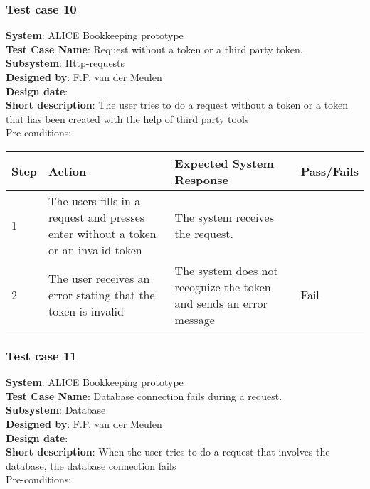 \subsubsection{Test case 10}
\textbf{System}:  ALICE Bookkeeping prototype \\
\textbf{Test Case Name}:  Request without a token or a third party token. \\
\textbf{Subsystem}:  Http-requests \\
\textbf{Designed by}:  F.P. van der Meulen\\
\textbf{Design date}:  \\
\textbf{Short description}: The user tries to do a request without a token or a token that has been created with the help of third party tools \\

Pre-conditions: \\

\begin{longtable}{ | p{0.8cm} | p{4.5cm} | p{6cm} | p{1.5cm} |}
\hline
Step & Action & Expected System Response & Pass/Fails  \\ \hline
1 & The users fills in a request and presses enter without a token or an invalid token & The system receives the request. &  \\ \hline
2 & The user receives an error stating that the token is invalid & The system does not recognize the token and sends an error message & Fail \\ \hline
\end{longtable}
\subsubsection{Test case 11}
\textbf{System}:  ALICE Bookkeeping prototype \\
\textbf{Test Case Name}:  Database connection fails during a request. \\
\textbf{Subsystem}:  Database \\
\textbf{Designed by}:  F.P. van der Meulen\\
\textbf{Design date}:  \\
\textbf{Short description}: When the user tries to do a request that involves the database, the database connection fails \\

Pre-conditions: \\

